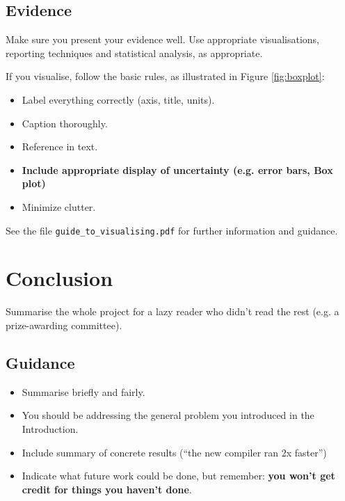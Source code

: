 \documentclass{l4proj}
\begin{document}
\section{Evidence}
Make sure you present your evidence well. Use appropriate visualisations, reporting techniques and statistical analysis, as appropriate.

If you visualise, follow the basic rules, as illustrated in Figure \ref{fig:boxplot}:
\begin{itemize}
\item Label everything correctly (axis, title, units).
\item Caption thoroughly.
\item Reference in text.
\item \textbf{Include appropriate display of uncertainty (e.g. error bars, Box plot)}
\item Minimize clutter.
\end{itemize}

See the file \texttt{guide\_to\_visualising.pdf} for further information and guidance.



\chapter{Conclusion}    
Summarise the whole project for a lazy reader who didn't read the rest (e.g. a prize-awarding committee).
\section{Guidance}
\begin{itemize}
    \item
        Summarise briefly and fairly.
    \item
        You should be addressing the general problem you introduced in the
        Introduction.        
    \item
        Include summary of concrete results (``the new compiler ran 2x
        faster'')
    \item
        Indicate what future work could be done, but remember: \textbf{you
        won't get credit for things you haven't done}.
\end{itemize}

%
% 
\end{document}

